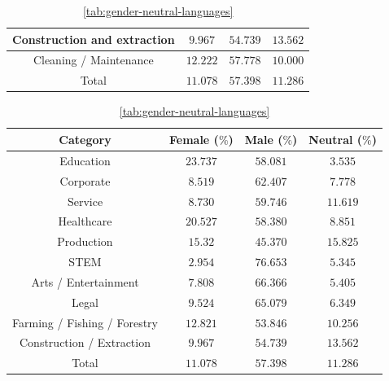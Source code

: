 \documentclass[fleqn,10pt]{article}
\begin{document}
\begin{table}[H]
{\begin{tabular}{|c|c|c|c|}
	Construction and extraction				& $9.967$		& $54.739$		& $13.562$		\\ \hline
	Cleaning / Maintenance					& $12.222$		& $57.778$		& $10.000$		\\ \hline
	\hline
	Total           						& $11.078$ 		& $57.398$ 		& $11.286$ 		\\ \hline
	\end{tabular}
	\caption{\ref{tab:gender-neutral-languages}}
	\label{tab:gender-by-category}
	}
\end{table}

\begin{table}[H]
\small{
	\centering
	\begin{tabular}{|c|c|c|c|}
	\hline
	Category 								& Female ($\%$)			& Male ($\%$)			& Neutral ($\%$)	\\ \hline
	\hline
	Education								& $23.737$				& $58.081$				& $3.535$			\\ \hline
	Corporate								& $8.519$				& $62.407$				& $7.778$			\\ \hline
	Service									& $8.730$				& $59.746$				& $11.619$			\\ \hline
	Healthcare								& $20.527$				& $58.380$				& $8.851$			\\ \hline
	Production								& $15.32$				& $45.370$				& $15.825$			\\ \hline
	STEM									& $2.954$				& $76.653$				& $5.345$			\\ \hline
	Arts / Entertainment					& $7.808$				& $66.366$				& $5.405$			\\ \hline
	Legal									& $9.524$				& $65.079$				& $6.349$			\\ \hline
	Farming / Fishing / Forestry			& $12.821$				& $53.846$				& $10.256$			\\ \hline
	Construction / Extraction				& $9.967$				& $54.739$				& $13.562$			\\ \hline
	\hline
	Total           						& $11.078$ 				& $57.398$ 				& $11.286$ 			\\ \hline
	\end{tabular}
	\caption{\ref{tab:gender-neutral-languages}}
	\label{tab:gender-by-category-grouped}
	}
\end{table}
\end{document}
